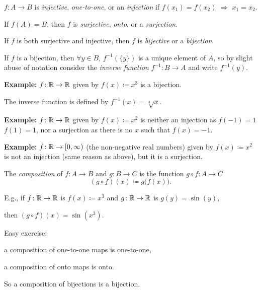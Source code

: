 \documentclass[10pt,aspectratio=149]{beamer}
\begin{document}
\begin{frame}
\begin{definition}
$f \colon A \to B$ is
\emph{injective}, \emph{one-to-one}, or an \emph{injection}
if $f(x_1) = f(x_2)$ $\Rightarrow$ $x_1 = x_2$.


\pause
\medskip

If $f(A) = B$, then $f$ is
\emph{surjective},
\emph{onto}, or a \emph{surjection}.


\pause
\medskip
If $f$ is both surjective and injective, then
$f$ is \emph{bijective} or a \emph{bijection}.

\pause
\medskip

If $f$ is a bijection, then $\forall y \in B$, $f^{-1}(\{y\})$ is a unique element of $A$,
so by slight abuse of notation
consider
the \emph{inverse function}
$f^{-1} \colon B \to A$
and write $f^{-1}(y)$.
\end{definition}

\pause
\textbf{Example:}
$f \colon {\mathbb{R}} \to {\mathbb{R}}$ given by $f(x) \coloneqq
x^3$ is a bijection.

\pause
The inverse function is defined by $f^{-1}(x) = \sqrt[3]{x}$.

\medskip
\pause
\textbf{Example:}
$f \colon {\mathbb{R}} \to {\mathbb{R}}$ given by $f(x) \coloneqq
x^2$ is neither an injection as $f(-1) = 1$  $f(1)=1$,
nor a surjection as there is no $x$ such that $f(x) = -1$.

\medskip
\pause
\textbf{Example:}
$f \colon {\mathbb{R}} \to [0,\infty)$ (the non-negative
real numbers) given by $f(x) \coloneqq x^2$ is not an injection (same reason as
above), but 
it is a surjection.

\end{frame}

\begin{frame}
\begin{definition}
The \emph{composition} of $f \colon A \to B$ and $g \colon B \to C$ is
the function
$g \circ f \colon A \to C$
\[
(g \circ f)(x) \coloneqq g\bigl(f(x)\bigr) .
\]
\end{definition}

\pause

E.g., if $f \colon {\mathbb{R}} \to {\mathbb{R}}$ is $f(x)\coloneqq x^3$ and $g \colon {\mathbb{R}} \to {\mathbb{R}}$
is $g(y) = \sin(y)$,

\pause
then $(g \circ f)(x) = \sin(x^3)$.

\medskip
\pause

Easy exercise:

\pause
a composition of one-to-one maps is one-to-one,

\pause
a composition of onto maps is onto.

\pause
So a composition of bijections is a bijection.
\end{frame}
\end{document}
